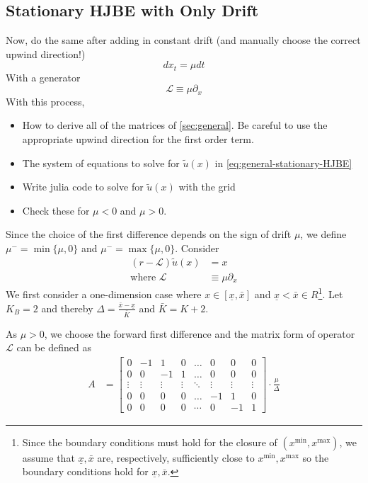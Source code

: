 \documentclass[11pt]{article}
\newcommand{\D}[1][]{\ensuremath{\partial_{#1}}}
\begin{document}
\subsection{Stationary HJBE with Only Drift}
Now, do the same after adding in constant drift (and manually choose the correct upwind direction!)
$$
d x_t = \mu dt
$$
With a generator
$$
	\mathcal{L} \equiv \mu \D[x]
$$
With this process,
\begin{itemize}
	\item How to derive all of the matrices of \cref{sec:general}.  Be careful to use the appropriate upwind direction for the first order term.
	\item The system of equations to solve for $\tilde{u}(x)$ in \cref{eq:general-stationary-HJBE}
	\item Write julia code to solve for $\tilde{u}(x)$ with the grid
	\item Check these for $\mu < 0$ and $\mu > 0$.
\end{itemize}
Since the choice of the first difference depends on the sign of drift $\mu$, we define $\mu^- =\min\{\mu, 0\}$ and $\mu^- =\max\{\mu, 0\}$.
Consider
\begin{align}
(r - \mathcal{L} )\tilde{u}(x) &= x\label{HJBE_PDE_with_drifts}\\
\text{where }\mathcal{L}&\equiv \mu\partial_{x}
\end{align}
We first consider a one-dimension case where $x\in [\underline{\textit{\~{x}}}, \bar{\textit{\~{x}}}]$ and $\underline{\textit{\~{x}}} < \bar{\textit{\~{x}}} \in R$\footnote{Since the boundary conditions must hold for the closure of $(x^{\min},x^{\max})$, we assume that $\underline{\textit{\~{x}}}, \bar{\textit{\~{x}}}$ are, respectively, sufficiently close to $x^{\min}, x^{\max}$ so the boundary conditions hold for $\underline{\textit{\~{x}}}, \bar{\textit{\~{x}}}$.}. Let $K_B = 2$ and thereby $\Delta  = \frac{\bar{\textit{\~{x}}} - \underline{\textit{\~{x}}}}{\bar{K}}$ and $\bar{K} = K+2$.

As $\mu>0$, we choose the forward first difference and the matrix form of operator $\mathcal{L}$ can be defined as
\begin{align}
A &= \begin{bmatrix}
0&-1&1&0&\dots&0&0&0\\
0&0&-1&1&\dots&0&0&0\\
\vdots&\vdots&\vdots&\vdots&\ddots&\vdots&\vdots&\vdots\\
0&0&0&0&\dots&-1&1&0\\
0&0&0&0&\cdots&0&-1&1
\end{bmatrix}\cdot\frac{\mu}{\Delta}
\end{align}
\end{document}
